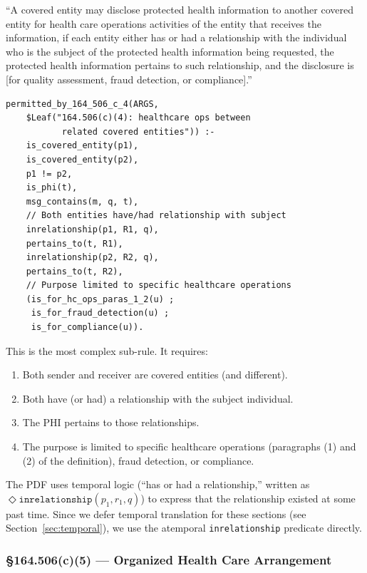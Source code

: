 \documentclass[11pt,letterpaper]{article}
\begin{document}
\begin{hipaabox}
``A covered entity may disclose protected health information to another covered entity for health care operations activities of the entity that receives the information, if each entity either has or had a relationship with the individual who is the subject of the protected health information being requested, the protected health information pertains to such relationship, and the disclosure is [for quality assessment, fraud detection, or compliance].''
\end{hipaabox}

\begin{lstlisting}[style=soufflestyle,caption={\S 164.506(c)(4)}]
permitted_by_164_506_c_4(ARGS,
    $Leaf("164.506(c)(4): healthcare ops between
           related covered entities")) :-
    is_covered_entity(p1),
    is_covered_entity(p2),
    p1 != p2,
    is_phi(t),
    msg_contains(m, q, t),
    // Both entities have/had relationship with subject
    inrelationship(p1, R1, q),
    pertains_to(t, R1),
    inrelationship(p2, R2, q),
    pertains_to(t, R2),
    // Purpose limited to specific healthcare operations
    (is_for_hc_ops_paras_1_2(u) ;
     is_for_fraud_detection(u) ;
     is_for_compliance(u)).
\end{lstlisting}

This is the most complex sub-rule. It requires:
\begin{enumerate}
  \item Both sender and receiver are covered entities (and different).
  \item Both have (or had) a relationship with the subject individual.
  \item The PHI pertains to those relationships.
  \item The purpose is limited to specific healthcare operations (paragraphs (1) and (2) of the definition), fraud detection, or compliance.
\end{enumerate}

\begin{designbox}
The PDF uses temporal logic (``has or had a relationship,'' written as $\Diamond \texttt{inrelationship}(p_1, r_1, q)$) to express that the relationship existed at some past time. Since we defer temporal translation for these sections (see Section~\ref{sec:temporal}), we use the atemporal \texttt{inrelationship} predicate directly.
\end{designbox}

\subsubsection{\S 164.506(c)(5) --- Organized Health Care Arrangement}
\end{document}
